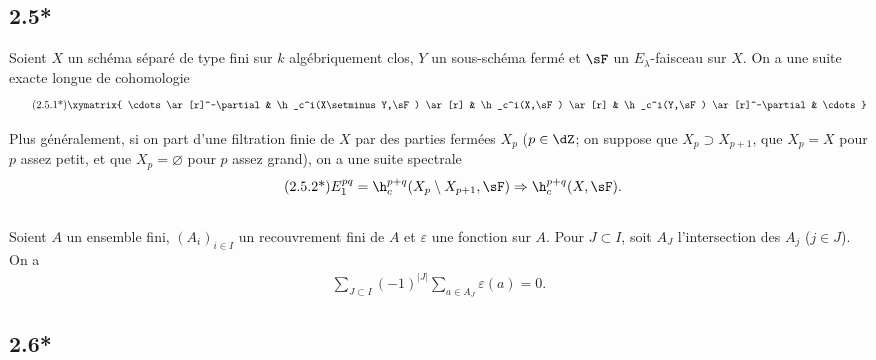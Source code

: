 \subsection*{2.5*}\label{VI:2-5*}

Soient $X$ un schéma séparé de type fini sur $k$ algébriquement clos, 
$Y$ un sous-schéma fermé et $\sF$ un $E_\lambda$-faisceau sur $X$. On a 
une suite exacte longue de cohomologie 
\begin{align*}\tag{2.5.1*}\label{VI:eq:2-5-1*}
\xymatrix{
  \cdots \ar[r]^-\partial 
    & \h_c^i(X\setminus Y,\sF) \ar[r] 
    & \h_c^i(X,\sF) \ar[r] 
    & \h_c^i(Y,\sF) \ar[r]^-\partial 
    & \cdots 
}
\end{align*}

Plus généralement, si on part d'une filtration finie de $X$ par des parties 
fermées $X_p$ ($p\in \dZ$; on suppose que $X_p\supset X_{p+1}$, que $X_p=X$ 
pour $p$ assez petit, et que $X_p=\varnothing$ pour $p$ assez grand), on a une 
suite spectrale 
\begin{align*}\tag{2.5.2*}\label{VI:eq:2-5-2*}
  E_1^{p q} = \h_c^{p+q}(X_p\setminus X_{p+1},\sF) \Rightarrow \h_c^{p+q}(X,\sF) \text{.}
\end{align*}





\subsection{}\label{VI:2-6}

Soient $A$ un ensemble fini, $(A_i)_{i\in I}$ un recouvrement fini de $A$ et 
$\varepsilon$ une fonction sur $A$. Pour $J\subset I$, soit $A_J$ 
l'intersection des $A_j$ ($j\in J$). On a 
\begin{align*}\tag{2.6.1}\label{VI:eq:2-6-1}
  \sum_{J\subset I} (-1)^{|J|} \sum_{a\in A_J} \varepsilon(a) = 0 \text{.}
\end{align*}





\subsection*{2.6*}\label{VI:2-6*}

